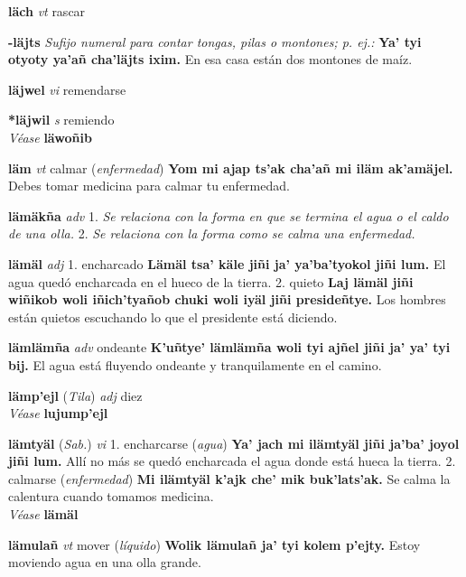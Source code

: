 \documentclass[10pt]{scrbook}
\newcommand{\entry}[1]{\textbf{#1}}
\newcommand{\onedefinition}[1]{#1.}
\newcommand{\nontranslationdef}[1]{\textit{#1}}
\newcommand{\partofspeech}[1]{\textit{#1}}
\newcommand{\spanishtranslation}[1]{#1}
\newcommand{\clarification}[1]{(\textit{#1})}
\newcommand{\cholexample}[1]{\textbf{#1}}
\newcommand{\exampletranslation}[1]{#1}
\newcommand{\alsosee}[1]{\\\textit{Véase} \textbf{#1}}
\newcommand{\relevantdialect}[1]{(\textit{#1})}
\begin{document}
\begin{multicols}{2}
\entry{läch}
\partofspeech{vt}
\spanishtranslation{rascar}

\entry{-läjts}
\nontranslationdef{Sufijo numeral para contar tongas, pilas o montones; p. ej.:}
\cholexample{Ya' tyi otyoty ya'añ cha'läjts ixim.}
\exampletranslation{En esa casa están dos montones de maíz.}

\entry{läjwel}
\partofspeech{vi}
\spanishtranslation{remendarse}

\entry{*läjwil}
\partofspeech{s}
\spanishtranslation{remiendo}
\alsosee{läwoñib}

\entry{läm}
\partofspeech{vt}
\spanishtranslation{calmar}
\clarification{enfermedad}
\cholexample{Yom mi ajap ts'ak cha'añ mi iläm ak'amäjel.}
\exampletranslation{Debes tomar medicina para calmar tu enfermedad.}

\entry{lämäkña}
\partofspeech{adv}
\onedefinition{1}
\nontranslationdef{Se relaciona con la forma en que se termina el agua o el caldo de una olla.}
\onedefinition{2}
\nontranslationdef{Se relaciona con la forma como se calma una enfermedad.}

\entry{lämäl}
\partofspeech{adj}
\onedefinition{1}
\spanishtranslation{encharcado}
\cholexample{Lämäl tsa' käle jiñi ja' ya'ba'tyokol jiñi lum.}
\exampletranslation{El agua quedó encharcada en el hueco de la tierra.}
\onedefinition{2}
\spanishtranslation{quieto}
\cholexample{Laj lämäl jiñi wiñikob woli iñich'tyañob chuki woli iyäl jiñi presideñtye.}
\exampletranslation{Los hombres están quietos escuchando lo que el presidente está diciendo.}

\entry{lämlämña}
\partofspeech{adv}
\spanishtranslation{ondeante}
\cholexample{K'uñtye' lämlämña woli tyi ajñel jiñi ja' ya' tyi bij.}
\exampletranslation{El agua está fluyendo ondeante y tranquilamente en el camino.}

\entry{lämp'ejl}
\relevantdialect{Tila}
\partofspeech{adj}
\spanishtranslation{diez}
\alsosee{lujump'ejl}

\entry{lämtyäl}
\relevantdialect{Sab.}
\partofspeech{vi}
\onedefinition{1}
\spanishtranslation{encharcarse}
\clarification{agua}
\cholexample{Ya' jach mi ilämtyäl jiñi ja'ba' joyol jiñi lum.}
\exampletranslation{Allí no más se quedó encharcada el agua donde está hueca la tierra.}
\onedefinition{2}
\spanishtranslation{calmarse}
\clarification{enfermedad}
\cholexample{Mi ilämtyäl k'ajk che' mik buk'lats'ak.}
\exampletranslation{Se calma la calentura cuando tomamos medicina.}
\alsosee{lämäl}

\entry{lämulañ}
\partofspeech{vt}
\spanishtranslation{mover}
\clarification{líquido}
\cholexample{Wolik lämulañ ja' tyi kolem p'ejty.}
\exampletranslation{Estoy moviendo agua en una olla grande.}


\end{multicols}
\end{document}
